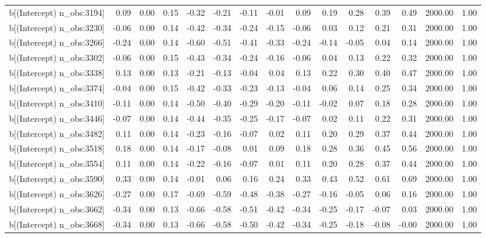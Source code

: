 \begin{table}[ht]
\begin{tabular}{rrrrrrrrrrrrrrr}
  b[(Intercept) n\_obs:3194] & 0.09 & 0.00 & 0.15 & -0.32 & -0.21 & -0.11 & -0.01 & 0.09 & 0.19 & 0.28 & 0.39 & 0.49 & 2000.00 & 1.00 \\ 
  b[(Intercept) n\_obs:3230] & -0.06 & 0.00 & 0.14 & -0.42 & -0.34 & -0.24 & -0.15 & -0.06 & 0.03 & 0.12 & 0.21 & 0.31 & 2000.00 & 1.00 \\ 
  b[(Intercept) n\_obs:3266] & -0.24 & 0.00 & 0.14 & -0.60 & -0.51 & -0.41 & -0.33 & -0.24 & -0.14 & -0.05 & 0.04 & 0.14 & 2000.00 & 1.00 \\ 
  b[(Intercept) n\_obs:3302] & -0.06 & 0.00 & 0.15 & -0.43 & -0.34 & -0.24 & -0.16 & -0.06 & 0.04 & 0.13 & 0.22 & 0.32 & 2000.00 & 1.00 \\ 
  b[(Intercept) n\_obs:3338] & 0.13 & 0.00 & 0.13 & -0.21 & -0.13 & -0.04 & 0.04 & 0.13 & 0.22 & 0.30 & 0.40 & 0.47 & 2000.00 & 1.00 \\ 
  b[(Intercept) n\_obs:3374] & -0.04 & 0.00 & 0.15 & -0.42 & -0.33 & -0.23 & -0.13 & -0.04 & 0.06 & 0.14 & 0.25 & 0.34 & 2000.00 & 1.00 \\ 
  b[(Intercept) n\_obs:3410] & -0.11 & 0.00 & 0.14 & -0.50 & -0.40 & -0.29 & -0.20 & -0.11 & -0.02 & 0.07 & 0.18 & 0.28 & 2000.00 & 1.00 \\ 
  b[(Intercept) n\_obs:3446] & -0.07 & 0.00 & 0.14 & -0.44 & -0.35 & -0.25 & -0.17 & -0.07 & 0.02 & 0.11 & 0.22 & 0.31 & 2000.00 & 1.00 \\ 
  b[(Intercept) n\_obs:3482] & 0.11 & 0.00 & 0.14 & -0.23 & -0.16 & -0.07 & 0.02 & 0.11 & 0.20 & 0.29 & 0.37 & 0.44 & 2000.00 & 1.00 \\ 
  b[(Intercept) n\_obs:3518] & 0.18 & 0.00 & 0.14 & -0.17 & -0.08 & 0.01 & 0.09 & 0.18 & 0.28 & 0.36 & 0.45 & 0.56 & 2000.00 & 1.00 \\ 
  b[(Intercept) n\_obs:3554] & 0.11 & 0.00 & 0.14 & -0.22 & -0.16 & -0.07 & 0.01 & 0.11 & 0.20 & 0.28 & 0.37 & 0.44 & 2000.00 & 1.00 \\ 
  b[(Intercept) n\_obs:3590] & 0.33 & 0.00 & 0.14 & -0.01 & 0.06 & 0.16 & 0.24 & 0.33 & 0.43 & 0.52 & 0.61 & 0.69 & 2000.00 & 1.00 \\ 
  b[(Intercept) n\_obs:3626] & -0.27 & 0.00 & 0.17 & -0.69 & -0.59 & -0.48 & -0.38 & -0.27 & -0.16 & -0.05 & 0.06 & 0.16 & 2000.00 & 1.00 \\ 
  b[(Intercept) n\_obs:3662] & -0.34 & 0.00 & 0.13 & -0.66 & -0.58 & -0.51 & -0.42 & -0.34 & -0.25 & -0.17 & -0.07 & 0.03 & 2000.00 & 1.00 \\ 
  b[(Intercept) n\_obs:3668] & -0.34 & 0.00 & 0.13 & -0.66 & -0.58 & -0.50 & -0.42 & -0.34 & -0.25 & -0.18 & -0.08 & -0.00 & 2000.00 & 1.00 \\ 

\end{tabular}
\end{table}
